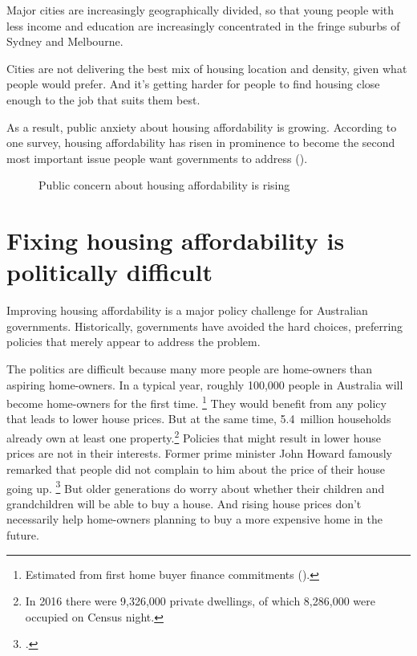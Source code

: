 Major cities are increasingly geographically divided, so that young people with less income and education are increasingly concentrated in the fringe suburbs of Sydney and Melbourne.

Cities are not delivering the best mix of housing location and density, given what people would prefer.
And it's getting harder for people to find housing close enough to the job that suits them best.

As a result, public anxiety about housing affordability is growing.
According to one survey, housing affordability has risen in prominence to become the second most important issue people want governments to address ().


\begin{figure}
\caption{Public concern about housing affordability is rising\label{fig:public-concern-survey}}
%
{\textcites{AHURI-2017-concerned}{EssentialReport-2017}}
\end{figure}

\section{Fixing housing affordability is politically difficult}\label{sec:fixing-housing-affordability-is-politically-difficult}

Improving housing affordability is a major policy challenge for Australian governments.
Historically, governments have avoided the hard choices, preferring policies that merely appear to address the problem.

The politics are difficult because many more people are home-owners than aspiring home-owners.
In a typical year, roughly 100,000 people in Australia will become home-owners for the first time.%
\footnote{Estimated from first home buyer finance commitments  (\textcite{ABSHousingFinanceAustraliaAugust2017}).}
They would benefit from any policy that leads to lower house prices.
But at the same time, 5.4~million households already own at least one property.\footnote{In 2016 there were 9,326,000 private dwellings, of which 8,286,000 were occupied on Census night.} 
Policies that might result in lower house prices are not in their interests.
Former prime minister John Howard famously remarked that people did not complain to him about the price of their house going up.%
	\footcite{age-2003-house-prices}
But older generations do worry about whether their children and grandchildren will be able to buy a house.
And rising house prices don't necessarily help home-owners planning to buy a more expensive home in the future.

